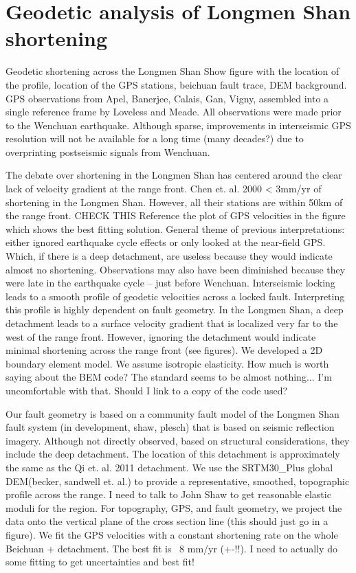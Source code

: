 \documentclass{article}
\begin{document}
\section{Geodetic analysis of Longmen Shan shortening}
Geodetic shortening across the Longmen Shan
Show figure with the location of the profile, location of the GPS stations, beichuan fault trace, DEM background.
GPS observations from Apel, Banerjee, Calais, Gan, Vigny, assembled into a single reference frame by Loveless and Meade.
All observations were made prior to the Wenchuan earthquake.
Although sparse, improvements in interseismic GPS resolution will not be available for a long time (many decades?) due to overprinting postseismic signals from Wenchuan.

The debate over shortening in the Longmen Shan has centered around the clear lack of velocity gradient at the range front.
Chen et. al. 2000 < 3mm/yr of shortening in the Longmen Shan.
However, all their stations are within 50km of the range front. CHECK THIS
Reference the plot of GPS velocities in the figure which shows the best fitting solution.
General theme of previous interpretations: either ignored earthquake cycle effects or only looked at the near-field GPS.
Which, if there is a deep detachment, are useless because they would indicate almost no shortening.
Observations may also have been diminished because they were late in the earthquake cycle – just before Wenchuan.
Interseismic locking leads to a smooth profile of geodetic velocities across a locked fault.
Interpreting this profile is highly dependent on fault geometry.
In the Longmen Shan, a deep detachment leads to a surface velocity gradient that is localized very far to the west of the range front.
However, ignoring the detachment would indicate minimal shortening across the range front (see figures).
We developed a 2D boundary element model.
We assume isotropic elasticity.
How much is worth saying about the BEM code?
The standard seems to be almost nothing...
I'm uncomfortable with that.
Should I link to a copy of the code used?

Our fault geometry is based on a community fault model of the Longmen Shan fault system (in development, shaw, plesch) that is based on seismic reflection imagery.
Although not directly observed, based on structural considerations, they include the deep detachment.
The location of this detachment is approximately the same as the Qi et. al. 2011 detachment. We use the SRTM30\_Plus global DEM(becker, sandwell et. al.)  to provide a representative, smoothed, topographic profile across the range. 
I need to talk to John Shaw to get reasonable elastic moduli for the region.
For topography, GPS, and fault geometry, we project the data onto the vertical plane of the cross section line (this should just go in a figure).
We fit the GPS velocities with a constant shortening rate on the whole Beichuan + detachment. The best fit is ~8 mm/yr (+-!!). 
I need to actually do some fitting to get uncertainties and best fit!
\end{document}
